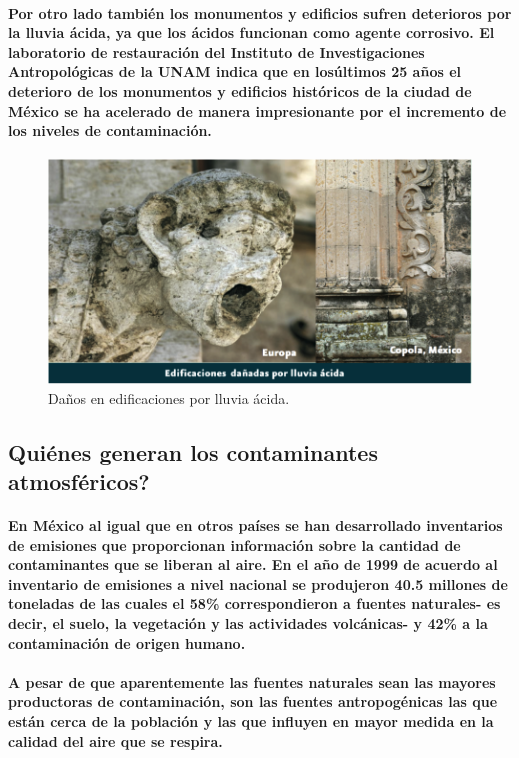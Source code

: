    \paragraph {Por otro lado también los monumentos y edificios sufren deterioros por la lluvia ácida, ya que los ácidos funcionan como agente corrosivo. El laboratorio de restauración del Instituto de Investigaciones Antropológicas de la UNAM indica que en losúltimos 25 años el deterioro de los monumentos y edificios históricos de la ciudad de México se ha acelerado de manera impresionante por el incremento de los niveles de contaminación.}

    \begin{figure}[h!]
      \centering
        \includegraphics[width=\textwidth]{./images/3.png}
      \caption{Daños en edificaciones por lluvia ácida.}
    \end{figure}

  \subsection {Quiénes generan los contaminantes atmosféricos?}
    \paragraph {En México al igual que  en otros países se han desarrollado inventarios de emisiones que proporcionan información sobre la cantidad de contaminantes que se liberan al aire. En el año de 1999 de acuerdo al inventario de emisiones a nivel nacional se produjeron 40.5 millones de toneladas de las cuales el 58\% correspondieron a fuentes naturales- es decir, el suelo, la vegetación y las actividades volcánicas-    y 42\% a la contaminación de origen humano.}

    \paragraph {A pesar de que aparentemente las fuentes naturales sean las mayores productoras de contaminación, son las fuentes antropogénicas las que están cerca de la población y las que influyen en mayor medida en la calidad del aire que se respira.}

